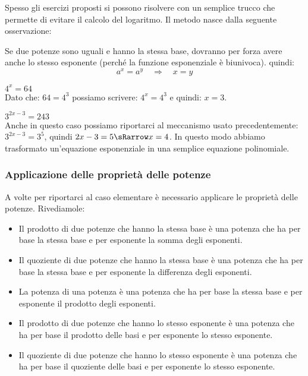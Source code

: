 Spesso gli esercizi proposti si possono risolvere con un semplice trucco 
che permette di evitare il calcolo del logaritmo. Il metodo nasce dalla 
seguente osservazione:

\begin{osservazione}
Se due potenze sono uguali e hanno la stessa base, dovranno per 
forza avere anche lo stesso esponente (perché la funzione esponenziale è 
biunivoca). quindi: 
\[ a^x = a^y \quad \Longrightarrow \quad x=y\]
\end{osservazione}

\begin{esempio}
\(4^x=64\) \\[4pt]
Dato che: \(64=4^3\) possiamo scrivere: \(4^x=4^3\) e quindi: \(x=3\).
\end{esempio}

\begin{esempio}
\(3^{2x-3}=243\)\\[4pt] 
Anche in questo caso possiamo riportarci al 
meccanismo usato precedentemente: \(3^{2x-3}=3^5\), quindi 
\({2x-3}=5 \sRarrow x = 4\). 
In questo modo abbiamo trasformato un'equazione esponenziale 
in una semplice equazione polinomiale.
\end{esempio}

\subsubsection{Applicazione delle proprietà delle potenze}
\label{subsubsec:esplog_eq_proprpot}

A volte per riportarci al caso elementare è necessario applicare le 
proprietà delle potenze. Rivediamole:

\begin{itemize} %
 \item {}
 Il prodotto di due  potenze che hanno la stessa base è una potenza che ha 
per base la stessa base e per esponente la somma degli esponenti.
 \item {}
 Il quoziente di due  potenze che hanno la stessa base è una potenza che ha 
per base la stessa base e per esponente la differenza degli esponenti.
 \item {}
 La potenza di una potenza è una potenza che ha per base la stessa base e 
per esponente il prodotto degli esponenti.
 \item {}
 Il prodotto di due  potenze che hanno lo stesso esponente è una potenza 
che ha per base il prodotto delle basi e per esponente lo stesso esponente.
 \item {}
 Il quoziente di due  potenze che hanno lo stesso esponente è una potenza 
che ha per base il quoziente delle basi e per esponente lo stesso esponente.
\end{itemize}

